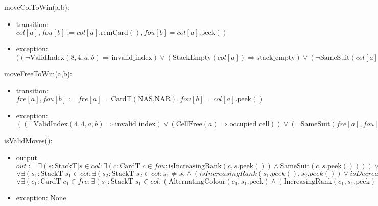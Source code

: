 \documentclass[12pt]{article}
\newcommand{\means}{\Rightarrow}
\newcommand{\m}[1]{\mbox{#1}}
\begin{document}
\noindent moveColToWin(a,b):
\begin{itemize}
    \item transition: $col[a], fou[b] := col[a].\m{remCard}(), fou[b]=col[a].\m{peek}()$
    \item exception: $((\lnot \m{ValidIndex}(8,4,a,b) \means \m{invalid\_index}) \lor (\m{StackEmpty}(col[a]) \means \m{stack\_empty}) \lor (\lnot \m{SameSuit}(col[a].\m{peek}(),fou[b]) \means \m{not\_same\_suit}) \lor (\lnot \m{IncreasingRank}(fou[b],col[a].\m{peek}()) \means \m{not\_ascending\_rank})$
\end{itemize}

\noindent moveFreeToWin(a,b):
\begin{itemize}
    \item transition: $fre[a], fou[b] := fre[a]=\mbox{CardT}(\mbox{NAS,NAR}), fou[b]=col[a].\m{peek}()$
    \item exception: $((\lnot \m{ValidIndex}(4,4,a,b) \means \m{invalid\_index}) \lor (\m{CellFree}(a) \means \m{occupied\_cell})) \lor (\lnot \m{SameSuit}(fre[a],fou[b]) \means \m{not\_same\_suit}) \lor (\lnot \m{IncreasingRank}(fou[b],fre[a] \means \m{not\_ascending\_rank})$
\end{itemize}

\noindent isValidMoves():
\begin{itemize}
    \item output $out := \exists(s:\m{StackT}|s \in col: \exists(c:\m{CardT}|c \in fou: \m{isIncreasingRank}(c,s.\m{peek}()) \land \m{SameSuit}(c,s.\m{peek}()))) \lor \exists(c_1:\m{CardT}|c_1 \in fre: \exists(c_2:\m{CardT}|c_2 \in fou: \m{isIncreasingRank}(c_2,c_1) \land \m{SameSuit}(c_1,c_2)))$\\
    $\lor \exists(s_1:\m{StackT}|s_1 \in col: \exists(s_2:\m{StackT}|s_2 \in col: s_1 \neq s_2 \land (isIncreasingRank(s_1.peek(),s_2.peek()) \lor isDecreasingRank(s_1.peek(),s_2.peek())) \land iAlternatingRank(S_1.peek(),s_2.peek()) \land \lnot isStackEmpty(s_1) \land \lnot isStackEmpty(s_2) ))$\\
    $\lor \exists(c_1:\m{CardT}|c_1 \in fre: \exists (s_1:\m{StackT}|s_1 \in col: (\m{AlternatingColour}(c_1,s_1.\m{peek}) \land (\m{IncreasingRank}(c_1,s_1.\m{peek}) \lor \m{DecreasingRank}(c_1,s_1.\m{peek})) \land c_1.\m{isValid}()) \lor (\lnot c_1.\m{isValid})\land \lnot \m{isStackEmpty}(s_1) )) $\\
    \item exception: None
\end{itemize}
\end{document}
